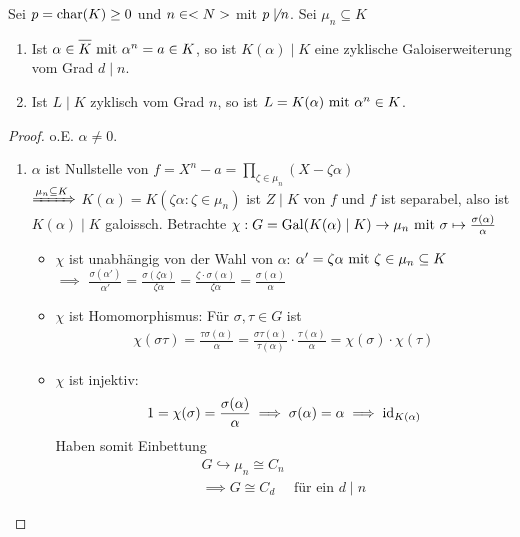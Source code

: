 \begin{proposition}[Kummer]
	Sei $p = \chara(K) \ge 0$ und $n \in \N$ mit $p \not\mid n$. Sei $\mu_n \subseteq K$
	\begin{enumerate}
		\item Ist $\alpha \in \overline{K} \mit \alpha^n = a \in K$, so ist $K(\alpha) \mid K$ eine zyklische Galoiserweiterung vom Grad $d \mid n$.
		\item Ist $L \mid K$ zyklisch vom Grad $n$, so ist $L = K(\alpha) \mit \alpha^n \in K$.
	\end{enumerate}
\end{proposition}
\begin{proof}
	o.E. $\alpha \neq 0$.
	\begin{enumerate}
		\item $\alpha$ ist Nullstelle von $f = X^n - a = \prod_{\zeta \in \mu_n} (X-\zeta \alpha)$\\
		$\xRightarrow{\mu_n \subseteq K}$ $K(\alpha) = K(\zeta \alpha\colon \zeta \in \mu_n)$ ist $Z \mid K$ von $f$ und $f$ ist separabel, also ist $K(\alpha) \mid K$ galoissch. Betrachte $\chi: G=\Gal(K(\alpha)\mid K) \to \mu_n \mit \sigma \mapsto \frac{\sigma(\alpha)}{\alpha}$
		\begin{itemize}
			\item $\chi$ ist unabhängig von der Wahl von $\alpha$: $\alpha' = \zeta \alpha \mit \zeta \in \mu_n \subseteq K$\\
			$\implies$ $\frac{\sigma(\alpha')}{\alpha'} = \frac{\sigma(\zeta\alpha)}{\zeta \alpha} = \frac{\zeta \cdot \sigma(\alpha)}{\zeta \alpha} = \frac{\sigma(\alpha)}{\alpha}$
			\item $\chi$ ist Homomorphismus: Für $\sigma, \tau \in G$ ist
			\begin{align*}
				\chi(\sigma \tau) = \frac{\tau \sigma(\alpha)}{\alpha} = \frac{\sigma\tau(\alpha)}{\tau(\alpha)}\cdot \frac{\tau(\alpha)}{\alpha} = \chi(\sigma)\cdot \chi(\tau)
			\end{align*}
			\item $\chi$ ist injektiv:
			\begin{align*}
				1 = \chi(\sigma) = \frac{\sigma(\alpha)}{\alpha} \implies \sigma(\alpha) = \alpha \implies \id_{K(\alpha)}
			\end{align*}
			Haben somit Einbettung
			\begin{align*}
				G  \hookrightarrow \mu_n \cong C_n\\
				\implies G \cong C_d \quad \text{ für ein } d\mid n
			\end{align*}

\end{itemize}
\end{enumerate}
\end{proof}
